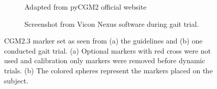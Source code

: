 \documentclass[../main.tex]{subfiles}
\begin{document}
\begin{figure}[!ht]
\begin{subfigure}[t]{0.58\textwidth}
         \caption{Adapted from pyCGM2 official website \cite{Leboeuf2019}}
         \label{fig:cgm23-markerset-guidelines}
     \end{subfigure}
     \hfill
     \begin{subfigure}[t]{0.40\textwidth}
         \centering
         \caption{Screenshot from Vicon Nexus software during gait trial.}
         \label{fig:cgm23-markerset-experiment-capture}
     \end{subfigure}
    \caption{CGM2.3 marker set as seen from (a) the guidelines and (b) one conducted gait trial. (a) Optional markers with red cross were not used and calibration only markers were removed before dynamic trials. (b) The colored spheres represent the markers placed on the subject.}
    \label{fig:cgm23-markerset}
\end{figure}
\end{document}
